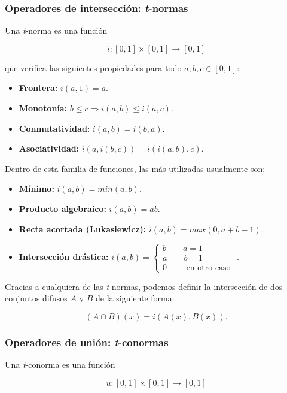 \subsubsection{Operadores de intersección: \textit{t}-normas}

Una \textit{t}-norma es una función

\[
\ i: [0,1] \times [0,1] \longrightarrow [0,1]
\]

que verifica las siguientes propiedades para todo $a,b,c \in [0,1]$:

\begin{itemize}
\item \textbf{Frontera:} $i(a,1) = a$.
\item \textbf{Monotonía:} $b \leq c \Rightarrow i(a,b) \leq i(a,c)$.
\item \textbf{Conmutatividad:} $i(a,b) = i(b,a)$.
\item \textbf{Asociatividad:} $i(a,i(b,c)) = i(i(a,b),c)$.
\end{itemize}

Dentro de esta familia de funciones, las más utilizadas usualmente son:

\begin{itemize}
\item \textbf{Mínimo:} $i(a,b)= min(a,b)$.
\item \textbf{Producto algebraico:} $i(a,b)= ab$.
\item \textbf{Recta acortada (Lukasiewicz):} $i(a,b)= max(0,a+b-1)$.
\item \textbf{Intersección drástica:} $i(a,b)= \left\lbrace
  \begin{array}{l}
     b \qquad a = 1 \\
     a \qquad b = 1 \\
     0 \qquad \textrm{ en otro caso }
  \end{array}
  \right.$.
\end{itemize}

Gracias a cualquiera de las \textit{t}-normas, podemos definir la intersección de dos conjuntos difusos $A$ y $B$ de la siguiente forma:

\[
\ (A\cap B)(x)= i(A(x),B(x)).
\]

\subsubsection{Operadores de unión: \textit{t}-conormas}

Una \textit{t}-conorma es una función

\[
\ u: [0,1] \times [0,1] \longrightarrow [0,1]
\]

